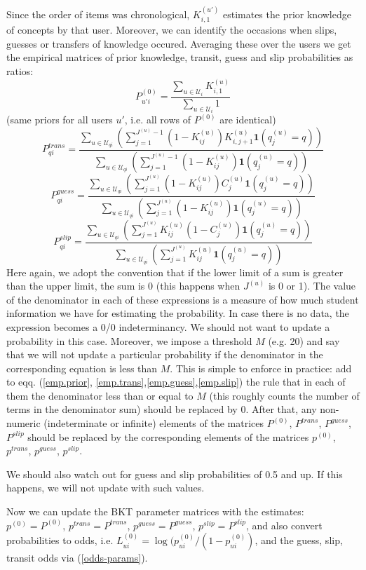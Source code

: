 \documentclass{sigchi}
\newcommand{\1}{\mathbf{1}}
\newcommand{\be}{\begin{equation}}
\newcommand{\ee}{\end{equation}}
\begin{document}
Since the order of items was chronological, $K^{(u')}_{i,1}$ estimates the prior knowledge of concepts by that user. Moreover, we can identify the occasions when slips, guesses or transfers of knowledge occured. Averaging these over the users we get the empirical matrices of prior knowledge, transit, guess and slip probabilities as ratios:
\be\label{emp.prior} P^{(0)}_{u'i}=\frac{\sum_{u\in\mathcal{U}_i}K^{(u)}_{i,1}}{\sum_{u\in\mathcal{U}_i}1}\ee
(same priors for all users $u'$, i.e. all rows of $P^{(0)}$ are identical)
\be\label{emp.trans} P^{trans}_{qi}=\frac{\sum_{u\in\mathcal{U}_{qi}}\left(\sum_{j=1}^{J^{(u)}-1}(1-K^{(u)}_{ij})K^{(u)}_{i,j+1}\1(q^{(u)}_j=q)\right)}{\sum_{u\in\mathcal{U}_{qi}}\left(\sum_{j=1}^{J^{(u)}-1}(1-K^{(u)}_{ij})\1(q^{(u)}_j=q)\right)}\ee
\be\label{emp.guess} P^{guess}_{qi}=\frac{\sum_{u\in\mathcal{U}_{qi}}\left(\sum_{j=1}^{J^{(u)}}(1-K^{(u)}_{ij})C^{(u)}_{j}\1(q^{(u)}_j=q)\right)}{\sum_{u\in\mathcal{U}_{qi}}\left(\sum_{j=1}^{J^{(u)}}(1-K^{(u)}_{ij})\1(q^{(u)}_j=q)\right)}\ee
\be\label{emp.slip} P^{slip}_{qi}=\frac{\sum_{u\in\mathcal{U}_{qi}}\left(\sum_{j=1}^{J^{(u)}}K^{(u)}_{ij}(1-C^{(u)}_{j})\1(q^{(u)}_j=q)\right)}{\sum_{u\in\mathcal{U}_{qi}}\left(\sum_{j=1}^{J^{(u)}}K^{(u)}_{ij}\1(q^{(u)}_j=q)\right)}\ee
Here again, we adopt the convention that if the lower limit of a sum is greater than the upper limit, the sum is 0 (this happens when $J^{(u)}$ is 0 or 1). The value of the denominator in each of these expressions is a measure of how much student information we have for estimating the probability. In case there is no data, the expression becomes a 0/0 indeterminancy. We should not want to update a probability in this case. Moreover, we impose a threshold $M$ (e.g. 20) and say that we will not update a particular probability if the denominator in the corresponding equation is less than $M$. This is simple to enforce in practice: add to eqq. (\ref{emp.prior}, \ref{emp.trans},\ref{emp.guess},\ref{emp.slip}) the rule that in each of them the denominator less than or equal to $M$ (this roughly counts the number of terms in the denominator sum) should be replaced by 0. After that, any non-numeric (indeterminate or infinite) elements of the matrices $P^{(0)}$, $P^{trans}$, $P^{guess}$, $P^{slip}$ should be replaced by the corresponding elements of the matrices $p^{(0)}$, $p^{trans}$, $p^{guess}$, $p^{slip}$.

We should also watch out for guess and slip probabilities of 0.5 and up. If this happens, we will not update with such values.

Now we can update the BKT parameter matrices with the estimates: $p^{(0)}=P^{(0)}$, $p^{trans}=P^{trans}$, $p^{guess}=P^{guess}$, $p^{slip}=P^{slip}$, and also convert probabilities to odds, i.e. $L^{(0)}_{ui}=\log(p^{(0)}_{ui}/(1-p^{(0)}_{ui})$, and the guess, slip, transit odds via (\ref{odds-params}).
\end{document}
